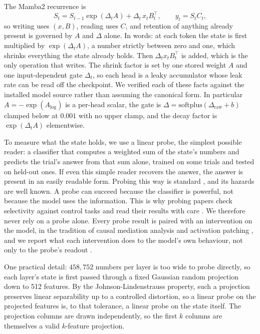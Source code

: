 \documentclass[10pt]{article}
\begin{document}
The Mamba2 recurrence is
\begin{equation}
S_t = S_{t-1}\exp(\Delta_t A) + \Delta_t\, x_t B_t^{\top},
\qquad y_t = S_t C_t ,
\end{equation}
so writing uses $(x, B)$, reading uses $C$, and retention of anything already
present is governed by $A$ and $\Delta$ alone. In words: at each token the
state is first multiplied by $\exp(\Delta_t A)$, a number strictly between
zero and one, which shrinks everything the state already holds. Then
$\Delta_t x_t B_t^{\top}$ is added, which is the only operation that writes.
The shrink factor is set by one stored weight $A$ and one input-dependent gate
$\Delta_t$, so each head is a leaky accumulator whose leak rate can be read
off the checkpoint. We verified each of these facts against the installed
model source rather than assuming the canonical form. In particular
$A = -\exp(A_{\log})$ is a per-head scalar, the gate is
$\Delta = \mathrm{softplus}(\Delta_{\text{raw}} + b)$ clamped below at
$0.001$ with no upper clamp, and the decay factor is
$\exp(\Delta_t A)$ elementwise.

To measure what the state holds, we use a linear probe, the simplest possible
reader: a classifier that computes a weighted sum of the state's numbers and
predicts the trial's answer from that sum alone, trained on some trials and
tested on held-out ones. If even this simple reader recovers the answer, the
answer is present in an easily readable form. Probing this way is standard
\cite{alain2016probes}, and its hazards are well known. A probe can
succeed because the classifier is powerful, not because the model uses the
information. This is why probing papers check selectivity against control
tasks \cite{hewitt2019control} and read their results with care
\cite{belinkov2022probing}. We therefore never rely on a probe alone. Every
probe result is paired with an intervention on the model, in the tradition of
causal mediation analysis \cite{vig2020causal} and activation patching
\cite{meng2022rome,wang2022ioi,zhang2024patching}, and we report what each
intervention does to the model's own behaviour, not only to the probe's
readout \cite{zhang2024patching}.

One practical detail: $458{,}752$ numbers per layer is too wide to probe
directly, so each layer's state is first passed through a fixed Gaussian
random projection down to 512 features. By the Johnson-Lindenstrauss property,
such a projection preserves linear separability up to a controlled distortion,
so a linear probe on the projected features is, to that tolerance, a linear
probe on the state itself. The projection columns are drawn independently, so
the first $k$ columns are themselves a valid $k$-feature projection.
\end{document}
